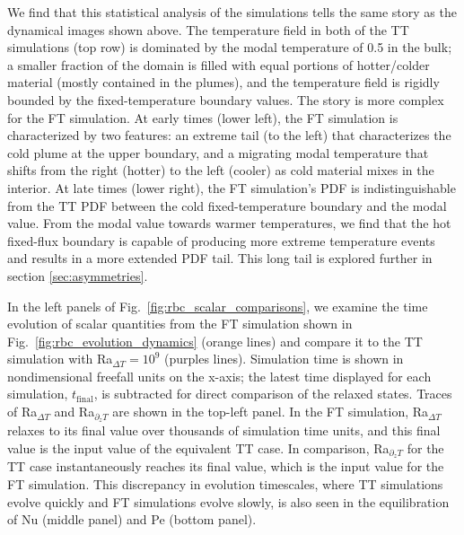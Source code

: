 \documentclass[aps, pre, onecolumn, nofootinbib, notitlepage, groupedaddress, amsfonts, amssymb, amsmath, longbibliography, superscriptaddress]{revtex4-1}
\begin{document}
We find that this statistical analysis of the simulations tells the same story as the dynamical images shown above.
The temperature field in both of the TT simulations (top row) is dominated by the modal temperature of 0.5 in the bulk; a smaller fraction of the domain is filled with equal portions of hotter/colder material (mostly contained in the plumes), and the temperature field is rigidly bounded by the fixed-temperature boundary values.
The story is more complex for the FT simulation.
At early times (lower left), the FT simulation is characterized by two features: an extreme tail (to the left) that characterizes the cold plume at the upper boundary, and a migrating modal temperature that shifts from the right (hotter) to the left (cooler) as cold material mixes in the interior.
At late times (lower right), the FT simulation's PDF is indistinguishable from the TT PDF between the cold fixed-temperature boundary and the modal value.
From the modal value towards warmer temperatures, we find that the hot fixed-flux boundary is capable of producing more extreme temperature events and results in a more extended PDF tail.
This long tail is explored further in section \ref{sec:asymmetries}.

In the left panels of Fig.~\ref{fig:rbc_scalar_comparisons}, we examine the time evolution of scalar quantities from the FT simulation shown in Fig.~\ref{fig:rbc_evolution_dynamics} (orange lines) and compare it to the TT simulation with Ra$_{\Delta T} = 10^9$ (purples lines).
Simulation time is shown in nondimensional freefall units on the x-axis; the latest time displayed for each simulation, $t_{\text{final}}$, is subtracted for direct comparison of the relaxed states.
Traces of Ra$_{\Delta T}$ and Ra$_{\partial_z T}$ are shown in the top-left panel.
In the FT simulation, Ra$_{\Delta T}$ relaxes to its final value over thousands of simulation time units, and this final value is the input value of the equivalent TT case.
In comparison, Ra$_{\partial_z T}$ for the TT case instantaneously reaches its final value, which is the input value for the FT simulation.
This discrepancy in evolution timescales, where TT simulations evolve quickly and FT simulations evolve slowly, is also seen in the equilibration of Nu (middle panel) and Pe (bottom panel).
\end{document}
